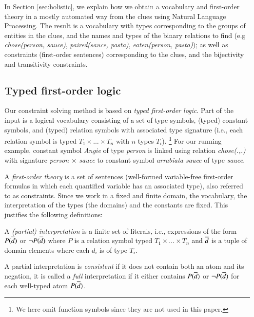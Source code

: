 In Section \ref{sec:holistic}, we explain how we obtain a vocabulary and first-order theory in a mostly automated way from the clues using Natural Language Processing. 
The result is a vocabulary with types corresponding to the groups of entities in the clues, and the names and types of the binary relations to find (e.g \textit{chose(person, sauce)}, \textit{paired(sauce, pasta)}, \textit{eaten(person, pasta)});
as well as constraints (first-order sentences) corresponding to the clues, and the bijectivity and transitivity constraints. 

\subsection{Typed first-order logic}

Our constraint solving method is based on \emph{typed first-order logic}. %
Part of the input is a logical vocabulary consisting of a set of type symbols, (typed) constant symbols, and (typed) relation symbols with associated type signature (i.e., each relation symbol is typed $T_1\times \dots \times T_n$ with $n$ types $T_i$).
\footnote{We here omit function symbols since they are not used in this paper.} 
For our running example, constant symbol \textit{Angie} of type \textit{person} is linked using relation \textit{chose(.,.)} with signature \textit{person $\times$ sauce} to constant symbol \textit{arrabiata sauce} of type \textit{sauce}.


A \emph{first-order theory} is a set of sentences (well-formed variable-free first-order formulas \cite{enderton} in which each quantified variable has an associated type), also referred to as constraints.
Since we work in a fixed and finite domain, the vocabulary, the interpretation of the types (the domains) and the constants are fixed.
This justifies the following definitions: 
\begin{definition}\label{def:partial-interpretation}
 A \emph{(partial) interpretation} is a finite set of literals, i.e., expressions of the form $P(\overline{d})$ or $\lnot P(\overline{d})$ where $P$ is a relation symbol typed $T_1\times\dots \times T_n$ and $\overline{d}$ is a tuple of domain elements where each $d_i$ is of type $T_i$. 
\end{definition}
 \begin{definition}\label{def:consistent}
 A partial interpretation is \emph{consistent} if it does not contain both an atom and its negation, it is called a \emph{full} interpretation if it either contains $P(\overline{d})$ or $\lnot P(\overline{d})$ for each well-typed atom $P(\overline{d})$. 
\end{definition}

